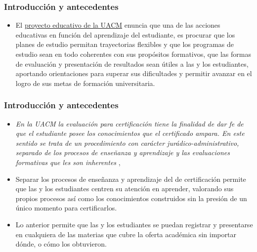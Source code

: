 \documentclass[xcolor=dvipsnames]{beamer}
\begin{document}
\begin{frame}\frametitle{Introducci\'on y antecedentes}

\begin{itemize}

\item El \href{https://drive.google.com/file/d/0B6AEksrqo4h1M2Q5OWVhOGEtODNlNy00M2M2LThkNTctZjE0ZjA4ZGJlZWZj/view?resourcekey=0-9eA5mzOWlPqKF8MTeYH9Iw}{proyecto educativo de la UACM} enuncia que una de las acciones educativas en funci\'on del aprendizaje del estudiante, es procurar que los planes de estudio permitan trayectorias flexibles y que los programas de estudio sean en todo coherentes con sus prop\'ositos formativos, que las formas de evaluaci\'on y presentaci\'on de resultados sean \'utiles a las y los estudiantes, aportando orientaciones  para superar sus dificultades y permitir avanzar en el logro de sus metas de formaci\'on universitaria.

\end{itemize}

\end{frame}


\begin{frame}\frametitle{Introducci\'on y antecedentes}
\begin{itemize}

\item \textit{En la UACM la evaluaci\'on para certificaci\'on tiene la finalidad de dar fe de que el estudiante posee los conocimientos que el certificado ampara. En este sentido se trata de un procedimiento con car\'acter jur\'adico-administrativo, separado de los procesos de ense\~nanza y aprendizaje y las evaluaciones formativas que les son inherentes} \cite{ProyectoEducativo}, 

\item Separar los procesos de ense\~nanza y aprendizaje del de certificaci\'on permite que las y los estudiantes centren su atenci\'on en aprender,  valorando sus propios procesos as\'i como los conocimientos construidos sin la presi\'on de un \'unico momento para certificarlos. 

\item Lo anterior permite que las y los estudiantes se puedan registrar y presentarse en cualquiera de las materias que cubre la oferta acad\'emica sin importar d\'onde, o c\'omo los obtuvieron. 



\end{itemize}
\end{frame}
\end{document}
